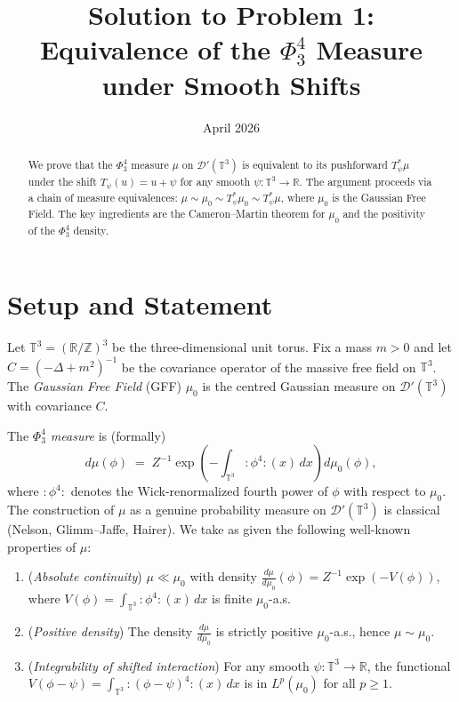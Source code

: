 \documentclass[12pt]{article}
\title{Solution to Problem 1:\\
Equivalence of the $\Phi^4_3$ Measure under Smooth Shifts}
\author{}
\date{April 2026}
\theoremstyle{definition}
\theoremstyle{remark}
\begin{document}
\maketitle

\begin{abstract}
We prove that the $\Phi^4_3$ measure $\mu$ on $\mathcal{D}'(\mathbb{T}^3)$ is
equivalent to its pushforward $T_\psi^*\mu$ under the shift $T_\psi(u) = u+\psi$
for any smooth $\psi:\mathbb{T}^3\to\mathbb{R}$.  The argument proceeds via a
chain of measure equivalences: $\mu\sim\mu_0\sim T_\psi^*\mu_0\sim T_\psi^*\mu$,
where $\mu_0$ is the Gaussian Free Field.  The key ingredients are the
Cameron--Martin theorem for $\mu_0$ and the positivity of the $\Phi^4_3$ density.
\end{abstract}

\section{Setup and Statement}

Let $\mathbb{T}^3 = (\mathbb{R}/\mathbb{Z})^3$ be the three-dimensional unit torus.
Fix a mass $m>0$ and let $C = (-\Delta + m^2)^{-1}$ be the covariance operator of
the massive free field on $\mathbb{T}^3$.  The \emph{Gaussian Free Field} (GFF)
$\mu_0$ is the centred Gaussian measure on $\mathcal{D}'(\mathbb{T}^3)$ with
covariance $C$.

The \emph{$\Phi^4_3$ measure} is (formally)
\[
  d\mu(\phi) \;=\; Z^{-1}\exp\!\left(-\int_{\mathbb{T}^3} :\!\phi^4\!:(x)\,dx\right)d\mu_0(\phi),
\]
where $:\!\phi^4\!:$ denotes the Wick-renormalized fourth power of $\phi$ with
respect to $\mu_0$.  The construction of $\mu$ as a genuine probability measure
on $\mathcal{D}'(\mathbb{T}^3)$ is classical (Nelson, Glimm--Jaffe, Hairer).
We take as given the following well-known properties of $\mu$:

\begin{enumerate}
\item[\textbf{(P1)}] (\emph{Absolute continuity})
  $\mu\ll\mu_0$ with density
  $\frac{d\mu}{d\mu_0}(\phi) = Z^{-1}\exp(-V(\phi))$,
  where $V(\phi)=\int_{\mathbb{T}^3}:\!\phi^4\!:(x)\,dx$ is finite $\mu_0$-a.s.

\item[\textbf{(P2)}] (\emph{Positive density})
  The density $\frac{d\mu}{d\mu_0}$ is strictly positive $\mu_0$-a.s.,
  hence $\mu\sim\mu_0$.

\item[\textbf{(P3)}] (\emph{Integrability of shifted interaction})
  For any smooth $\psi:\mathbb{T}^3\to\mathbb{R}$, the functional
  $V(\phi - \psi) = \int_{\mathbb{T}^3}:\!(\phi-\psi)^4\!:(x)\,dx$
  is in $L^p(\mu_0)$ for all $p\ge 1$.
\end{enumerate}
\end{document}
